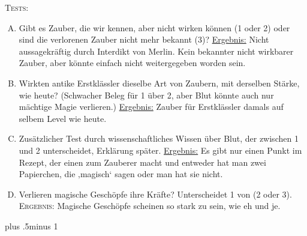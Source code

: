 \begin{centering}
\begin{samepage}
\scshape Tests:
\itshape
 \begin{enumerate}[A.]{
 \firmlist
 \setlength{\leftmargin}{\parindent}
 \setlength{\rightmargin}{1cm}}
\item Gibt es Zauber, die wir kennen, aber nicht wirken können (1 oder 2) oder sind die verlorenen Zauber nicht mehr bekannt (3)? \uline{Ergebnis:} Nicht aussagekräftig durch Interdikt von Merlin. Kein bekannter nicht wirkbarer Zauber, aber könnte einfach nicht weitergegeben worden sein.
\item Wirkten antike Erstklässler dieselbe Art von Zaubern, mit derselben Stärke, wie heute? (Schwacher Beleg für 1 über 2, aber Blut könnte auch nur mächtige Magie verlieren.) \uline{Ergebnis:} Zauber für Erstklässler damals auf selbem Level wie heute.
\item Zusätzlicher Test durch wissenschaftliches Wissen über Blut, der zwischen 1 und 2 unterscheidet, Erklärung später. \uline{Ergebnis:} Es gibt nur einen Punkt im Rezept, der einen zum Zauberer macht und entweder hat man zwei Papierchen, die ‚magisch‘ sagen oder man hat sie nicht.
\item Verlieren magische Geschöpfe ihre Kräfte? Unterscheidet 1 von (2 oder 3). {\scshape Ergebnis:} Magische Geschöpfe scheinen so stark zu sein, wie eh und je.
 \end{enumerate}
\end{samepage}
\end{centering}
\baselineskip plus .5\textheight minus 1\baselineskip
\restoretrivseps

